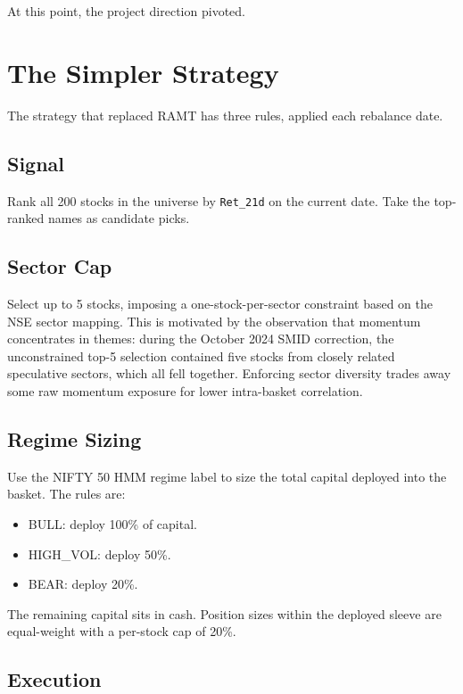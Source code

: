 \documentclass[conference]{IEEEtran}
\begin{document}
At this point, the project direction pivoted.

\section{The Simpler Strategy}

The strategy that replaced RAMT has three rules, applied each rebalance date.

\subsection{Signal}

Rank all 200 stocks in the universe by \texttt{Ret\_21d} on the current date. Take the top-ranked names as candidate picks.

\subsection{Sector Cap}

Select up to 5 stocks, imposing a one-stock-per-sector constraint based on the NSE sector mapping. This is motivated by the observation that momentum concentrates in themes: during the October 2024 SMID correction, the unconstrained top-5 selection contained five stocks from closely related speculative sectors, which all fell together. Enforcing sector diversity trades away some raw momentum exposure for lower intra-basket correlation.

\subsection{Regime Sizing}

Use the NIFTY 50 HMM regime label to size the total capital deployed into the basket. The rules are:

\begin{itemize}
    \item BULL: deploy 100\% of capital.
    \item HIGH\_VOL: deploy 50\%.
    \item BEAR: deploy 20\%.
\end{itemize}

The remaining capital sits in cash. Position sizes within the deployed sleeve are equal-weight with a per-stock cap of 20\%.

\subsection{Execution}
\end{document}
